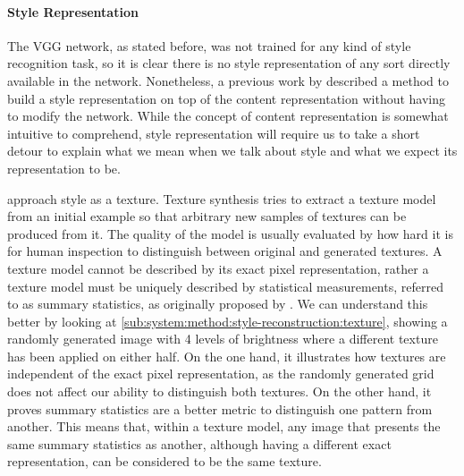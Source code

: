 \paragraph{Style Representation}
The VGG network, as stated before, was not trained for any kind of style recognition task, so it is clear there is no style representation of any sort directly available in the network.
Nonetheless, a previous work by \citet{Gatys2015A} described a method to build a style representation on top of the content representation without having to modify the network.
While the concept of content representation is somewhat intuitive to comprehend, style representation will require us to take a short detour to explain what we mean when we talk about style and what we expect its representation to be.

\citeauthor{Gatys2015A} approach style as a texture.
Texture synthesis tries to extract a texture model from an initial example so that arbitrary new samples of textures can be produced from it.
The quality of the model is usually evaluated by how hard it is for human inspection to distinguish between original and generated textures.
A texture model cannot be described by its exact pixel representation, rather a texture model must be uniquely described by statistical measurements, referred to as summary statistics, as originally proposed by \citet{Julesz1962}.
We can understand this better by looking at \autoref{sub:system:method:style-reconstruction:texture}, showing a randomly generated image with 4 levels of brightness where a different texture has been applied on either half.
On the one hand, it illustrates how textures are independent of the exact pixel representation, as the randomly generated grid does not affect our ability to distinguish both textures.
On the other hand, it proves summary statistics are a better metric to distinguish one pattern from another.
This means that, within a texture model, any image that presents the same summary statistics as another, although having a different exact representation, can be considered to be the same texture.

